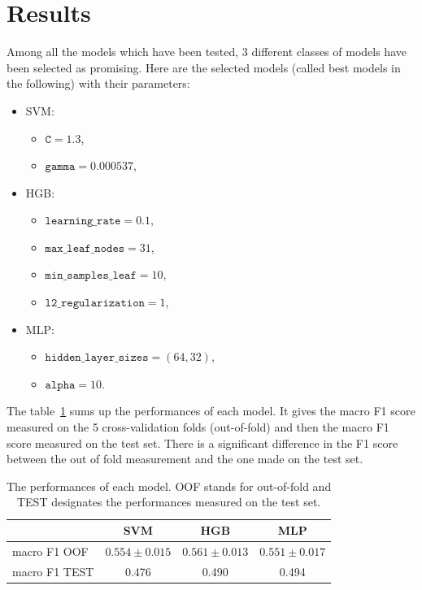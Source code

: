 \documentclass[11pt]{article}
\begin{document}
\section{Results}
  \label{sec:results}
Among all the models which have been tested, 3 different classes of models have been selected as promising. Here are the selected models (called best models in the following) with their parameters:
\begin{itemize}
\item SVM:
  \begin{itemize}
  \item   $\texttt{C}=1.3$, 
  \item $\texttt{gamma} = 0.000537$,
  \end{itemize}
\item HGB:
  \begin{itemize}
  \item   $\texttt{learning\_rate}=0.1$, 
  \item $\texttt{max\_leaf\_nodes}=31$, 
  \item $\texttt{min\_samples\_leaf}=10$, 
  \item $\texttt{l2\_regularization}=1$,
  \end{itemize}

\item MLP:
  \begin{itemize}
  \item  $\texttt{hidden\_layer\_sizes}=(64,32)$, 
  \item $\texttt{alpha}=10$.
  \end{itemize}
\end{itemize}

The table~\ref{tab:modelperf} sums up the performances of each model. It gives the macro F1 score measured on the 5 cross-validation folds (out-of-fold) and then the macro F1 score measured on the test set. There is a significant difference in the F1 score between the out of fold measurement and the one made on the test set.


\begin{table}[h]
  \centering
    \caption{The performances of each model. OOF stands for out-of-fold and TEST designates the performances measured on the test set.}
    \label{tab:modelperf}
  \begin{tabular}{|l|c|c|c|}
    \toprule
    & SVM & HGB & MLP \\
    \midrule
    macro F1 OOF & $0.554 \pm 0.015$  & $0.561 \pm 0.013$ & $0.551 \pm 0.017$ \\
    macro F1 TEST & 0.476 & 0.490 & 0.494 \\
    \bottomrule                        
  \end{tabular}
\end{table}
\end{document}
